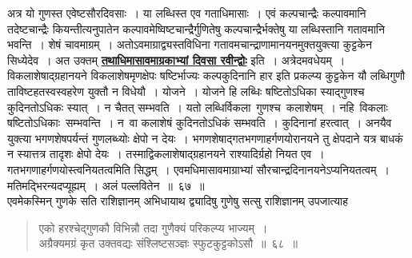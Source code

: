 \documentclass[11pt, openany]{book}
\begin{document}
{{अत्र  यो गुणस्त एवेष्टसौरदिवसाः~। या लब्धिस्त एव गताधिमासाः~। एवं
कल्पचान्द्रैः
 कल्पावमानि तदेष्टचान्द्रैः कियन्तीत्यनुपातेन
कल्पावमेष्विष्टचान्द्रैर्गुणितेषु कल्पचान्द्रैर्भक्तेषु
 या लब्धिस्तानि गतावमानि भवन्ति~। शेषं चावमाग्रम्~।
अतोऽवमाग्राद्व्यस्तविधिना गतावमचान्द्राणामानयनमुक्तयुक्त्या कुट्टकेन सिध्येदेव~। अत उक्तम् \hyperref[67]{\textbf{तथाधिमासावमाग्रकाभ्यां दिवसा रवीन्द्वोः}} इति~। अत्रेदमवधेयम्~। विकलाशेषाद्ग्रहानयने
 विकलाशेषमृणक्षेपः षष्टिर्भाज्यः कल्पकुदिनानि हार इति प्रकल्प्य
कुट्टकेन यौ
 लब्धिगुणौ ताविष्टहतस्वस्वहरेण युक्तौ न विधेयौ~। योजने~। योजने हि
लब्धिः
 षष्टितोऽधिका स्याद्गुणश्च कुदिनतोऽधिकः स्यात्~। न चैतत् सम्भवति~। यतो
लब्धिर्विकला \,गुणश्च \,कलाशेषम्~। नहि \,विकलाः \,षष्टितोऽधिकाः \,सम्भवन्ति~। न \,वा
कलाशेषं
 कुदिनतोऽधिकं सम्भवति~। कुदिनानां हरत्वात्~। अनयैव युक्त्या
भगणशेषपर्यन्तं
 गुणलब्ध्योः क्षेपो न देयः~। भगणशेषाद्गतभगणाहर्गणयोरानयने तु
क्षेपदाने यत्र
 बाधकं न स्यात्तत्र तादृशः क्षेपो देयः~। तस्माद्विकलाशेषाद्ग्रहानयने
राश्यादिर्ग्रहो
 नियत एव~। गतभगणाहर्गणयोस्त्वनियतत्वमिति सिद्धम्~।
एवमधिमासावमाग्राभ्यां
 सौरचान्द्रदिनानयनेऽप्यनियतत्वम्~। मतिमद्भिरन्यदप्यूह्यम्~। अलं
पल्लवितेन~॥~६७~॥~\\

\vspace{-4mm}
 एवमेकस्मिन् गुणके सति राशिज्ञानम् अभिधायाथ द्व्यादिषु गुणेषु सत्सु
राशिज्ञानम् उपजात्याह\textendash

 \label{68}
\begin{quote}
\ab
     एको हरश्चेद्गुणकौ विभिन्नौ तदा गुणैक्यं परिकल्प्य भाज्यम्~। \\
 अग्रैक्यमग्रं कृत उक्तवद्यः संश्लिष्टसञ्ज्ञः स्फुटकुट्टकोऽसौ~॥~६८~॥~
\end{quote}

}}
\end{document}
